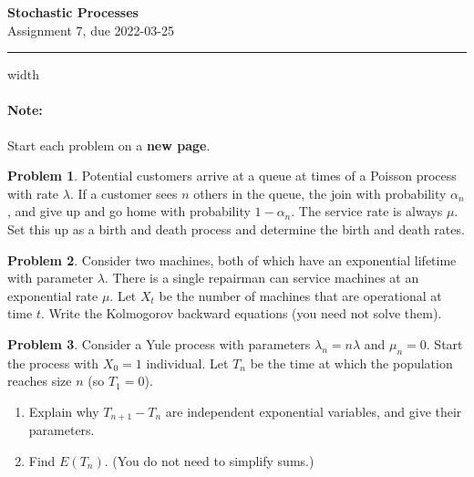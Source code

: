 \documentclass{article}
\theoremstyle{definition}
\newtheorem{problem}{Problem}
\begin{document}
\thispagestyle{crfooter}

\begin{center}
  {\LARGE \textbf{Stochastic Processes}} \\ \medskip
  {\Large Assignment 7, due 2022-03-25}
\end{center}

\hrule width \textwidth

\paragraph{Note:} Start each problem on a \textbf{new page}.%


\begin{problem}
  Potential customers arrive at a queue at times of a Poisson process with rate $\lambda$.
  If a customer sees $n$ others in the queue, the join with probability $\alpha_n$, and give up and go home with probability $1-\alpha_n$.
  The service rate is always $\mu$.
  Set this up as a birth and death process and determine the birth and death rates.
\end{problem}


\begin{problem}
  Consider two machines, both of which have an exponential lifetime with parameter $\lambda$.
  There is a single repairman can service machines at an exponential rate $\mu$.
  Let $X_t$ be the number of machines that are operational at time $t$.
  Write the Kolmogorov backward equations (you need not solve them).
\end{problem}


\begin{problem}
  Consider a Yule process with parameters $\lambda_n = n\lambda$ and $\mu_n=0$.
  Start the process with $X_0=1$ individual.
  Let $T_n$ be the time at which the population reaches size $n$ (so $T_1=0$).
  \begin{enumerate}
  \item Explain why $T_{n+1}-T_n$ are independent exponential variables, and give their parameters.
  \item Find $E(T_n)$. (You do not need to simplify sums.)
  \end{enumerate}
\end{problem}
\end{document}

